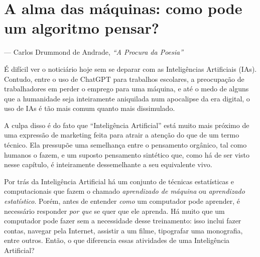 \chapter{A alma das máquinas: como pode um algoritmo pensar?}

\epigraph{
}{--- Carlos Drummond de Andrade, \textit{``A Procura da Poesia''}}

É difícil ver o noticiário hoje sem se deparar com as Inteligências Artificiais (IAs).
Contudo, entre o uso de ChatGPT para trabalhos escolares, a preocupação de trabalhadores em perder o emprego para uma máquina, e até o medo de alguns que a humanidade seja inteiramente aniquilada num apocalipse da era digital, o uso de IAs é tão mais comum quanto mais dissimulado.

A culpa disso é do fato que ``Inteligência Artificial'' está muito mais próximo de uma expressão de marketing feita para atrair a atenção do que de um termo técnico.
Ela pressupõe uma semelhança entre o pensamento orgânico, tal como humanos o fazem, e um suposto pensamento sintético que, como há de ser visto nesse capítulo, é inteiramente dessemelhante a seu equivalente vivo.

Por trás da Inteligência Artificial há um conjunto de técnicas estatísticas e computacionais que fazem o chamado \textit{aprendizado de máquina} ou \textit{aprendizado estatístico}.
Porém, antes de entender \textit{como} um computador pode aprender, é necessário responder \textit{por que} se quer que ele aprenda.
Há muito que um computador pode fazer sem a necessidade desse treinamento: isso inclui fazer contas, navegar pela Internet, assistir a um filme, tipografar uma monografia, entre outros.
Então, o que diferencia essas atividades de uma Inteligência Artificial?

